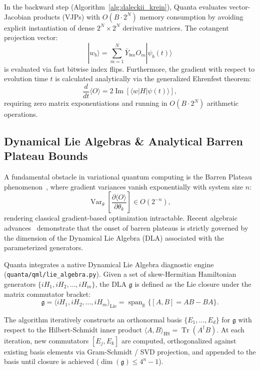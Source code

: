 \documentclass[aps,prx,twocolumn,superscriptaddress,nofootinbib]{revtex4-2}
\newcommand{\ket}[1]{|#1\rangle}
\newcommand{\bra}[1]{\langle#1|}
\newcommand{\Tr}{\operatorname{Tr}}
\newcommand{\Var}{\operatorname{Var}}
\newcommand{\Lie}{\operatorname{Lie}}
\begin{document}
In the backward step (Algorithm~\ref{alg:daleckii_krein}), Quanta evaluates vector-Jacobian products (VJPs) with $O(B \cdot 2^N)$ memory consumption by avoiding explicit instantiation of dense $2^N \times 2^N$ derivative matrices. The cotangent projection vector:
\begin{equation}
    \ket{w_b} = \sum_{m=1}^N \bar{Y}_{bm} O_m \ket{\psi_b(t)}
\end{equation}
is evaluated via fast bitwise index flips. Furthermore, the gradient with respect to evolution time $t$ is calculated analytically via the generalized Ehrenfest theorem:
\begin{equation}
    \frac{d}{dt} \langle O \rangle = 2 \operatorname{Im}\left[ \bra{w} H \ket{\psi(t)} \right],
\end{equation}
requiring zero matrix exponentiations and running in $O(B \cdot 2^N)$ arithmetic operations.

\subsection{Dynamical Lie Algebras \& Analytical Barren Plateau Bounds}
\label{subsec:dla_barren_plateaus}

A fundamental obstacle in variational quantum computing is the Barren Plateau phenomenon~\cite{mcclean2018barren}, where gradient variances vanish exponentially with system size $n$:
\begin{equation}
    \Var_\theta \left[ \frac{\partial \langle O \rangle}{\partial \theta_k} \right] \in O(2^{-n}),
\end{equation}
rendering classical gradient-based optimization intractable. Recent algebraic advances~\cite{fontana2024adjoint} demonstrate that the onset of barren plateaus is strictly governed by the dimension of the Dynamical Lie Algebra (DLA) associated with the parameterized generators.

Quanta integrates a native Dynamical Lie Algebra diagnostic engine (\texttt{quanta/qml/lie_algebra.py}). Given a set of skew-Hermitian Hamiltonian generators $\{i H_1, i H_2, \dots, i H_m\}$, the DLA $\mathfrak{g}$ is defined as the Lie closure under the matrix commutator bracket:
\begin{equation}
    \mathfrak{g} = \langle i H_1, i H_2, \dots, i H_m \rangle_{\Lie} = \operatorname{span}_{\mathbb{R}} \{ [A, B] = AB - BA \}.
\end{equation}

The algorithm iteratively constructs an orthonormal basis $\{E_1, \dots, E_d\}$ for $\mathfrak{g}$ with respect to the Hilbert-Schmidt inner product $\langle A, B \rangle_{\text{HS}} = \Tr(A^\dagger B)$. At each iteration, new commutators $[E_j, E_k]$ are computed, orthogonalized against existing basis elements via Gram-Schmidt / SVD projection, and appended to the basis until closure is achieved ($\dim(\mathfrak{g}) \le 4^n - 1$).
\end{document}
